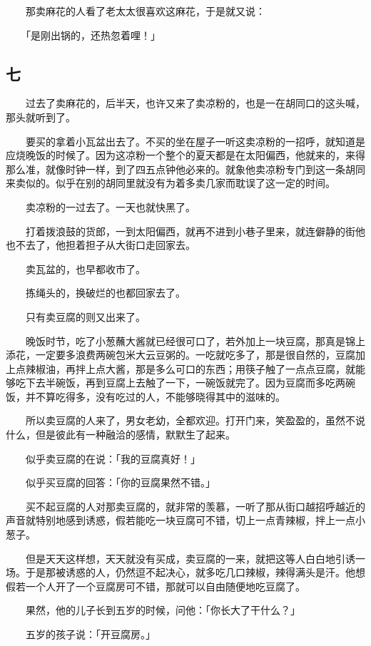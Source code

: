 \documentclass[UTF8]{ctexart}
\begin{document}
　　那卖麻花的人看了老太太很喜欢这麻花，于是就又说：

　　「是刚出锅的，还热忽着哩！」

\subsection{七}

　　过去了卖麻花的，后半天，也许又来了卖凉粉的，也是一在胡同口的这头喊，那头就听到了。

　　要买的拿着小瓦盆出去了。不买的坐在屋子一听这卖凉粉的一招呼，就知道是应烧晚饭的时候了。因为这凉粉一个整个的夏天都是在太阳偏西，他就来的，来得那么准，就像时钟一样，到了四五点钟他必来的。就象他卖凉粉专门到这一条胡同来卖似的。似乎在别的胡同里就没有为着多卖几家而耽误了这一定的时间。

　　卖凉粉的一过去了。一天也就快黑了。

　　打着拨浪鼓的货郎，一到太阳偏西，就再不进到小巷子里来，就连僻静的街他也不去了，他担着担子从大街口走回家去。

　　卖瓦盆的，也早都收市了。

　　拣绳头的，换破烂的也都回家去了。

　　只有卖豆腐的则又出来了。

　　晚饭时节，吃了小葱蘸大酱就已经很可口了，若外加上一块豆腐，那真是锦上添花，一定要多浪费两碗包米大云豆粥的。一吃就吃多了，那是很自然的，豆腐加上点辣椒油，再拌上点大酱，那是多么可口的东西；用筷子触了一点点豆腐，就能够吃下去半碗饭，再到豆腐上去触了一下，一碗饭就完了。因为豆腐而多吃两碗饭，并不算吃得多，没有吃过的人，不能够晓得其中的滋味的。

　　所以卖豆腐的人来了，男女老幼，全都欢迎。打开门来，笑盈盈的，虽然不说什么，但是彼此有一种融洽的感情，默默生了起来。

　　似乎卖豆腐的在说：「我的豆腐真好！」

　　似乎买豆腐的回答：「你的豆腐果然不错。」

　　买不起豆腐的人对那卖豆腐的，就非常的羡慕，一听了那从街口越招呼越近的声音就特别地感到诱惑，假若能吃一块豆腐可不错，切上一点青辣椒，拌上一点小葱子。

　　但是天天这样想，天天就没有买成，卖豆腐的一来，就把这等人白白地引诱一场。于是那被诱惑的人，仍然逗不起决心，就多吃几口辣椒，辣得满头是汗。他想假若一个人开了一个豆腐房可不错，那就可以自由随便地吃豆腐了。

　　果然，他的儿子长到五岁的时候，问他：「你长大了干什么？」

　　五岁的孩子说：「开豆腐房。」
\end{document}
